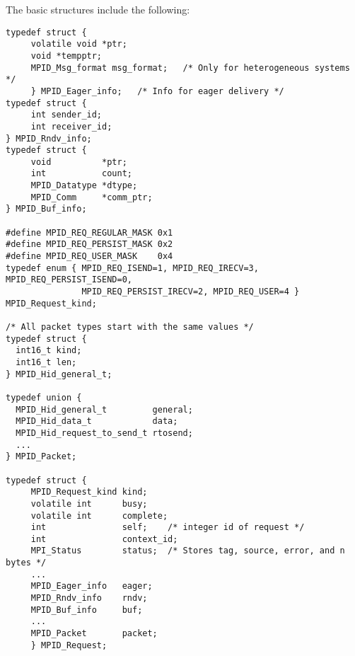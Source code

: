 The basic structures include the following:
\begin{verbatim}
typedef struct { 
     volatile void *ptr;
     void *tempptr;
     MPID_Msg_format msg_format;   /* Only for heterogeneous systems */
     } MPID_Eager_info;   /* Info for eager delivery */
typedef struct { 
     int sender_id;
     int receiver_id;
} MPID_Rndv_info;
typedef struct {
     void          *ptr;
     int           count;
     MPID_Datatype *dtype;
     MPID_Comm     *comm_ptr;
} MPID_Buf_info;

#define MPID_REQ_REGULAR_MASK 0x1
#define MPID_REQ_PERSIST_MASK 0x2
#define MPID_REQ_USER_MASK    0x4
typedef enum { MPID_REQ_ISEND=1, MPID_REQ_IRECV=3, MPID_REQ_PERSIST_ISEND=0,
               MPID_REQ_PERSIST_IRECV=2, MPID_REQ_USER=4 } MPID_Request_kind;

/* All packet types start with the same values */
typedef struct {
  int16_t kind;
  int16_t len;
} MPID_Hid_general_t;

typedef union {
  MPID_Hid_general_t         general;
  MPID_Hid_data_t            data;
  MPID_Hid_request_to_send_t rtosend;
  ...
} MPID_Packet;

typedef struct {
     MPID_Request_kind kind;
     volatile int      busy;
     volatile int      complete;
     int               self;    /* integer id of request */
     int               context_id;
     MPI_Status        status;  /* Stores tag, source, error, and n bytes */
     ...
     MPID_Eager_info   eager;
     MPID_Rndv_info    rndv;
     MPID_Buf_info     buf;
     ...
     MPID_Packet       packet;
     } MPID_Request;
\end{verbatim}

